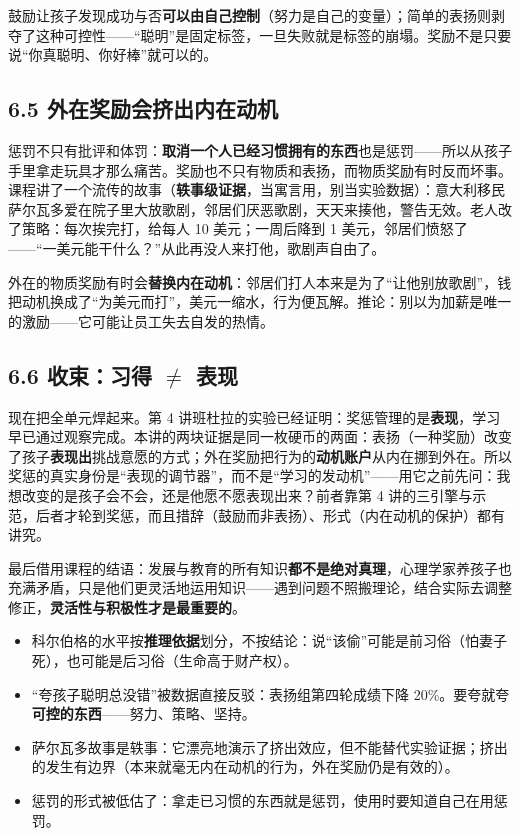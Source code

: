 \documentclass[UTF8,a4paper,11pt]{ctexart}
\begin{document}
\begin{keyconcept}
鼓励让孩子发现成功与否\textbf{可以由自己控制}（努力是自己的变量）；简单的表扬则剥夺了这种可控性——“聪明”是固定标签，一旦失败就是标签的崩塌。奖励不是只要说“你真聪明、你好棒”就可以的。
\end{keyconcept}

\subsection*{6.5 外在奖励会挤出内在动机}

惩罚不只有批评和体罚：\textbf{取消一个人已经习惯拥有的东西}也是惩罚——所以从孩子手里拿走玩具才那么痛苦。奖励也不只有物质和表扬，而物质奖励有时反而坏事。课程讲了一个流传的故事（\textbf{轶事级证据}，当寓言用，别当实验数据）：意大利移民萨尔瓦多爱在院子里大放歌剧，邻居们厌恶歌剧，天天来揍他，警告无效。老人改了策略：每次挨完打，给每人 10 美元；一周后降到 1 美元，邻居们愤怒了——“一美元能干什么？”从此再没人来打他，歌剧声自由了。

\begin{keyconcept}[挤出效应]
外在的物质奖励有时会\textbf{替换内在动机}：邻居们打人本来是为了“让他别放歌剧”，钱把动机换成了“为美元而打”，美元一缩水，行为便瓦解。推论：别以为加薪是唯一的激励——它可能让员工失去自发的热情。
\end{keyconcept}

\subsection*{6.6 收束：习得 $\neq$ 表现}

现在把全单元焊起来。第 4 讲班杜拉的实验已经证明：奖惩管理的是\textbf{表现}，学习早已通过观察完成。本讲的两块证据是同一枚硬币的两面：表扬（一种奖励）改变了孩子\textbf{表现出}挑战意愿的方式；外在奖励把行为的\textbf{动机账户}从内在挪到外在。所以奖惩的真实身份是“表现的调节器”，而不是“学习的发动机”——用它之前先问：我想改变的是孩子会不会，还是他愿不愿表现出来？前者靠第 4 讲的三引擎与示范，后者才轮到奖惩，而且措辞（鼓励而非表扬）、形式（内在动机的保护）都有讲究。

最后借用课程的结语：发展与教育的所有知识\textbf{都不是绝对真理}，心理学家养孩子也充满矛盾，只是他们更灵活地运用知识——遇到问题不照搬理论，结合实际去调整修正，\textbf{灵活性与积极性才是最重要的}。

\begin{keyconcept}[易错点与失效边界]
\begin{itemize}
  \item 科尔伯格的水平按\textbf{推理依据}划分，不按结论：说“该偷”可能是前习俗（怕妻子死），也可能是后习俗（生命高于财产权）。
  \item “夸孩子聪明总没错”被数据直接反驳：表扬组第四轮成绩下降 20\%。要夸就夸\textbf{可控的东西}——努力、策略、坚持。
  \item 萨尔瓦多故事是轶事：它漂亮地演示了挤出效应，但不能替代实验证据；挤出的发生有边界（本来就毫无内在动机的行为，外在奖励仍是有效的）。
  \item 惩罚的形式被低估了：拿走已习惯的东西就是惩罚，使用时要知道自己在用惩罚。
\end{itemize}
\end{keyconcept}
\end{document}

